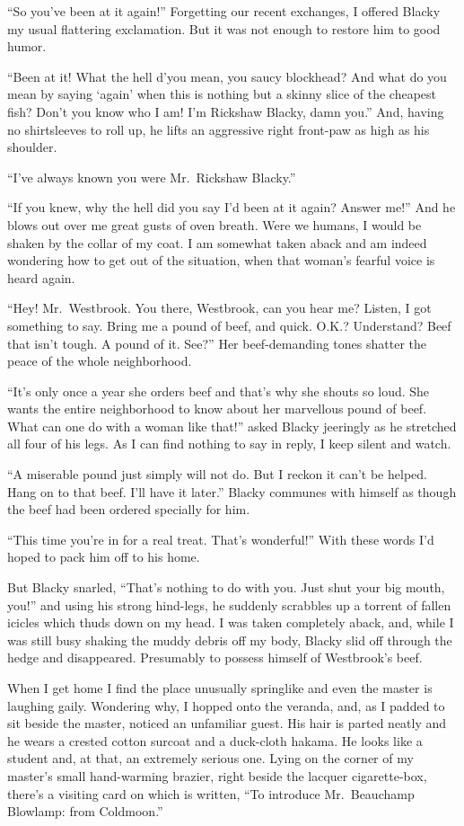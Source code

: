 \documentclass[12pt, openright]{book}
\begin{document}
``So you've been at it again!'' Forgetting our recent exchanges, I
offered Blacky my usual flattering exclamation. But it was not enough to
restore him to good humor.

``Been at it! What the hell d'you mean, you saucy blockhead? And what do
you mean by saying `again' when this is nothing but a skinny slice of
the cheapest fish? Don't you know who I am! I'm Rickshaw Blacky, damn
you.'' And, having no shirtsleeves to roll up, he lifts an aggressive
right front-paw as high as his shoulder.

``I've always known you were Mr.~Rickshaw Blacky.''

``If you knew, why the hell did you say I'd been at it again? Answer
me!'' And he blows out over me great gusts of oven breath. Were we
humans, I would be shaken by the collar of my coat. I am somewhat taken
aback and am indeed wondering how to get out of the situation, when that
woman's fearful voice is heard again.

``Hey! Mr.~Westbrook. You there, Westbrook, can you hear me? Listen, I
got something to say. Bring me a pound of beef, and quick. O.K.?
Understand? Beef that isn't tough. A pound of it. See?'' Her
beef-demanding tones shatter the peace of the whole neighborhood.

``It's only once a year she orders beef and that's why she shouts so
loud. She wants the entire neighborhood to know about her marvellous
pound of beef. What can one do with a woman like that!'' asked Blacky
jeeringly as he stretched all four of his legs. As I can find nothing to
say in reply, I keep silent and watch.

``A miserable pound just simply will not do. But I reckon it can't be
helped. Hang on to that beef. I'll have it later.'' Blacky communes with
himself as though the beef had been ordered specially for him.

``This time you're in for a real treat. That's wonderful!'' With these
words I'd hoped to pack him off to his home.

But Blacky snarled, ``That's nothing to do with you. Just shut your big
mouth, you!'' and using his strong hind-legs, he suddenly scrabbles up a
torrent of fallen icicles which thuds down on my head. I was taken
completely aback, and, while I was still busy shaking the muddy debris
off my body, Blacky slid off through the hedge and disappeared.
Presumably to possess himself of Westbrook's beef.

When I get home I find the place unusually springlike and even the
master is laughing gaily. Wondering why, I hopped onto the veranda, and,
as I padded to sit beside the master, noticed an unfamiliar guest. His
hair is parted neatly and he wears a crested cotton surcoat and a
duck-cloth hakama. He looks like a student and, at that, an extremely
serious one. Lying on the corner of my master's small hand-warming
brazier, right beside the lacquer cigarette-box, there's a visiting card
on which is written, ``To introduce Mr.~Beauchamp Blowlamp: from
Coldmoon.''
\end{document}
